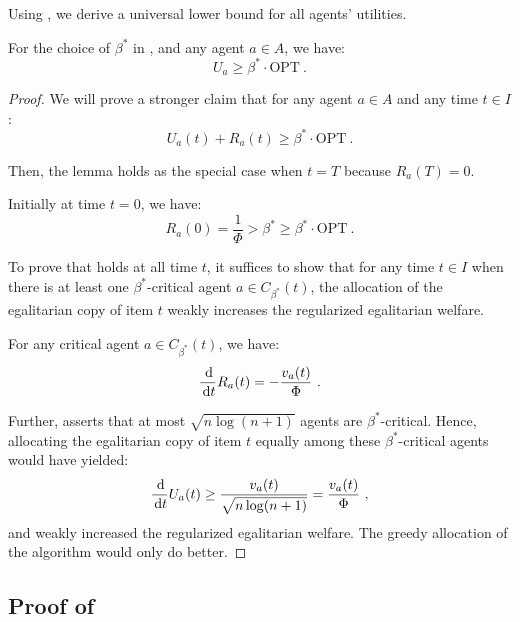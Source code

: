 \documentclass[11pt,letterpaper]{article}
\newcommand{\OPT}{\mathrm{OPT}}
\newcommand{\dif}[1]{\,\text{\rm d} #1}
\newcommand{\utility}{U}
\newcommand{\regularizer}{R}
\begin{document}
Using , we derive a universal lower bound for all agents' utilities.


\begin{lemma}
	\label{lem:negative-infinity-main-lemma}
	For the choice of $\beta^*$ in , and any agent $a \in A$, we have:
	\[
		\utility_a \ge \beta^* \cdot \OPT
		~.
	\]
\end{lemma}

\begin{proof}
	We will prove a stronger claim that for any agent $a \in A$ and any time $t \in I$:
	\begin{equation}
		\label{eqn:regularized-utility}
		\utility_a(t) + \regularizer_a(t) \ge \beta^* \cdot \OPT
		~.
	\end{equation}
	
	Then, the lemma holds as the special case when $t = T$ because $\regularizer_a(T) = 0$.
	
	
	Initially at time $t = 0$, we have:
	\[
		\regularizer_a(0) = \frac{1}{\Phi} > \beta^* \ge \beta^* \cdot \OPT
		~.
	\]
	
	To prove that  holds at all time $t$, it suffices to show that for any time $t \in I$ when there is at least one $\beta^*$-critical agent $a \in C_{\beta^*}(t)$, the allocation of the egalitarian copy of item $t$ weakly increases the regularized egalitarian welfare.
	
	For any critical agent $a \in C_{\beta^*}(t)$, we have:
	\[
	\frac{\dif}{\dif{t}} \regularizer_a (t) = - \frac{v_a(t)}{\Phi}
	~.
	\] 
	
	Further,  asserts that at most $\sqrt{n \log(n+1)}$ agents are $\beta^*$-critical.
	Hence, allocating the egalitarian copy of item $t$ equally among these $\beta^*$-critical agents would have yielded:
	\[
		\frac{\dif}{\dif{t}} \utility_a(t) \ge \frac{v_a(t)}{\sqrt{n \log (n+1)}} = \frac{v_a(t)}{\Phi}
		~,
	\]
	and weakly increased the regularized egalitarian welfare. 
	The greedy allocation of the algorithm would only do better.
\end{proof}











\subsection{Proof of }
\end{document}
